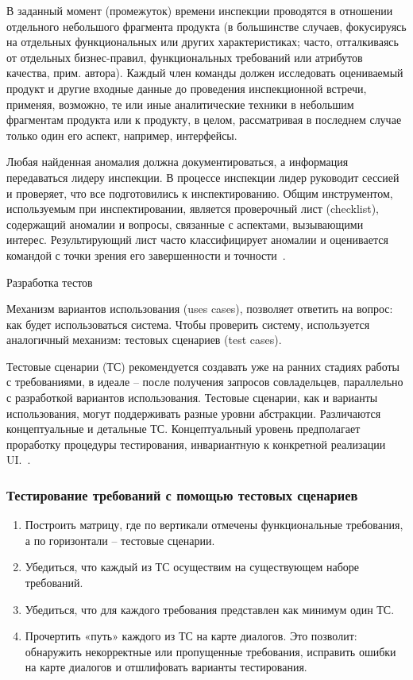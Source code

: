 \documentclass{../industrial-development}
\begin{document}
{В заданный момент (промежуток) времени инспекции проводятся в отношении отдельного небольшого фрагмента продукта (в большинстве случаев, фокусируясь на отдельных функциональных или других характеристиках; часто, отталкиваясь от отдельных бизнес-правил,
функциональных требований или атрибутов качества, прим. автора). Каждый член команды должен исследовать оцениваемый продукт и другие входные данные до проведения инспекционной встречи, применяя, возможно, те или иные аналитические техники в небольшим фрагментам продукта или к продукту, в целом, рассматривая в последнем случае только один его аспект, например, интерфейсы.

Любая найденная аномалия должна документироваться, а информация передаваться лидеру инспекции. В процессе инспекции лидер руководит сессией и проверяет, что все подготовились к инспектированию. Общим инструментом, используемым при инспектировании, является
проверочный лист (checklist), содержащий аномалии и вопросы, связанные с аспектами, вызывающими интерес. Результирующий лист часто классифицирует аномалии и оценивается командой с точки зрения его завершенности и точности~\cite[с.~67]{Maglinec}.

\alert{Разработка тестов}

Механизм вариантов использования (uses cases), позволяет ответить на вопрос: как будет использоваться система. Чтобы проверить
систему, используется аналогичный механизм: тестовых сценариев (test cases).

Тестовые сценарии (ТС) рекомендуется создавать уже на ранних стадиях работы с требованиями, в идеале – после получения запросов совладельцев, параллельно с разработкой вариантов использования. Тестовые сценарии, как и варианты использования, могут поддерживать разные уровни абстракции. Различаются концептуальные и детальные ТС. Концептуальный уровень предполагает проработку процедуры тестирования, инвариантную к конкретной реализации UI.~\cite[с.~67--68]{Maglinec}.


\begin{frame} \frametitle {Тестирование требований с помощью тестовых сценариев}
\begin{enumerate}
\item Построить матрицу, где по вертикали отмечены функциональные требования, а по горизонтали – тестовые сценарии.
\item Убедиться, что каждый из ТС осуществим на существующем наборе требований.
\item Убедиться, что для каждого требования представлен как минимум один ТС.
\item Прочертить «путь» каждого из ТС на карте диалогов. Это позволит: обнаружить некорректные или пропущенные требования, исправить ошибки на карте диалогов и отшлифовать варианты тестирования.
\end{enumerate}
\end{frame}

}
\end{document}
